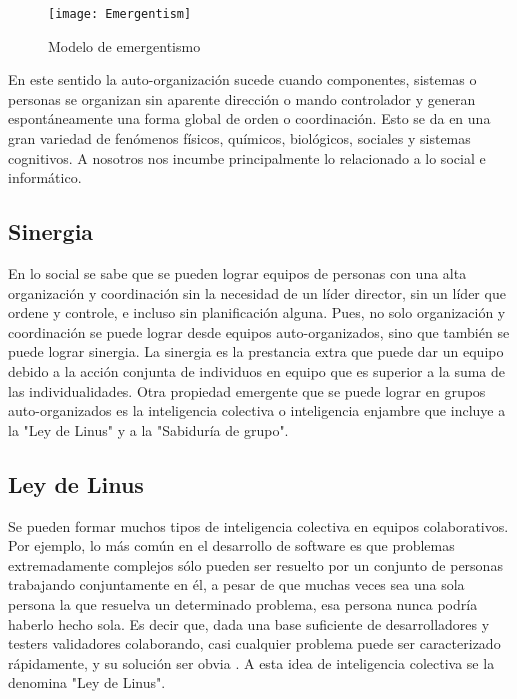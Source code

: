 \begin{figure}[h]
  \centering
  \texttt{[image: Emergentism]}
  \caption{Modelo de emergentismo}
  \centering
  \label{fig:Emergentism} %
\end{figure}

En este sentido la auto-organización sucede cuando componentes, sistemas o personas se organizan sin aparente dirección o mando controlador y generan espontáneamente una forma global de orden o coordinación. Esto se da en una gran variedad de fenómenos físicos, químicos, biológicos, sociales y sistemas cognitivos. A nosotros nos incumbe principalmente lo relacionado a lo social e informático. 

\subsection{Sinergia}

En lo social se sabe que se pueden lograr equipos de personas con una alta organización y coordinación sin la necesidad de un líder director, sin un líder que ordene y controle, e incluso sin planificación alguna. Pues, no solo organización y coordinación se puede lograr desde equipos auto-organizados, sino que también se puede lograr sinergia. La sinergia es la prestancia extra que puede dar un equipo debido a la acción conjunta de individuos en equipo que es superior a la suma de las individualidades. Otra propiedad emergente que se puede lograr en grupos auto-organizados es la inteligencia colectiva o inteligencia enjambre que incluye a la "Ley de Linus" y a la "Sabiduría de grupo".

\subsection{Ley de Linus}

Se pueden formar muchos tipos de inteligencia colectiva en equipos colaborativos. Por ejemplo, lo más común en el desarrollo de software es que problemas extremadamente complejos sólo pueden ser resuelto por un conjunto de personas trabajando conjuntamente en él, a pesar de que muchas veces sea una sola persona la que resuelva un determinado problema, esa persona nunca podría haberlo hecho sola. Es decir que, dada una base suficiente de desarrolladores y testers validadores colaborando, casi cualquier problema puede ser caracterizado rápidamente, y su solución ser obvia \cite{Eric-Raymond-1997}. A esta idea de inteligencia colectiva se la denomina "Ley de Linus".

